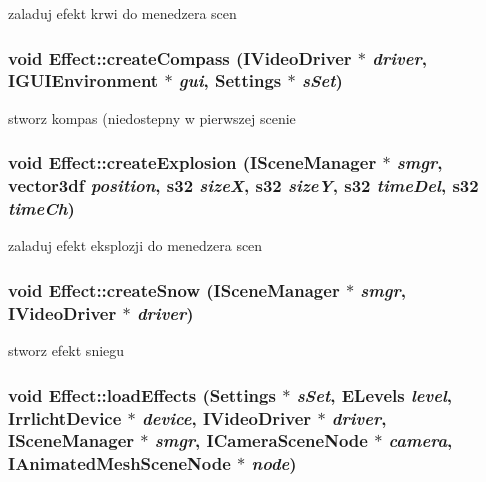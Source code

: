 \label{class_effect_a7e891cfd00f2b84413f07b27b733cca7}
zaladuj efekt krwi do menedzera scen \hypertarget{class_effect_afcda3f5ed73f16f0697b0467393b21eb}{
\subsubsection[{createCompass}]{\setlength{\rightskip}{0pt plus 5cm}void Effect::createCompass (IVideoDriver $\ast$ {\em driver}, \/  IGUIEnvironment $\ast$ {\em gui}, \/  {\bf Settings} $\ast$ {\em sSet})}}
\label{class_effect_afcda3f5ed73f16f0697b0467393b21eb}
stworz kompas (niedostepny w pierwszej scenie \hypertarget{class_effect_ae7902cfffa5177c32688e57b314dc933}{
\subsubsection[{createExplosion}]{\setlength{\rightskip}{0pt plus 5cm}void Effect::createExplosion (ISceneManager $\ast$ {\em smgr}, \/  vector3df {\em position}, \/  s32 {\em sizeX}, \/  s32 {\em sizeY}, \/  s32 {\em timeDel}, \/  s32 {\em timeCh})}}
\label{class_effect_ae7902cfffa5177c32688e57b314dc933}
zaladuj efekt eksplozji do menedzera scen \hypertarget{class_effect_aed73faf10c02bbfeb0e2d5d6f664790e}{
\subsubsection[{createSnow}]{\setlength{\rightskip}{0pt plus 5cm}void Effect::createSnow (ISceneManager $\ast$ {\em smgr}, \/  IVideoDriver $\ast$ {\em driver})}}
\label{class_effect_aed73faf10c02bbfeb0e2d5d6f664790e}
stworz efekt sniegu \hypertarget{class_effect_a3e8b0debd6152954a2292bc163c801de}{
\subsubsection[{loadEffects}]{\setlength{\rightskip}{0pt plus 5cm}void Effect::loadEffects ({\bf Settings} $\ast$ {\em sSet}, \/  ELevels {\em level}, \/  IrrlichtDevice $\ast$ {\em device}, \/  IVideoDriver $\ast$ {\em driver}, \/  ISceneManager $\ast$ {\em smgr}, \/  ICameraSceneNode $\ast$ {\em camera}, \/  IAnimatedMeshSceneNode $\ast$ {\em node})}}
